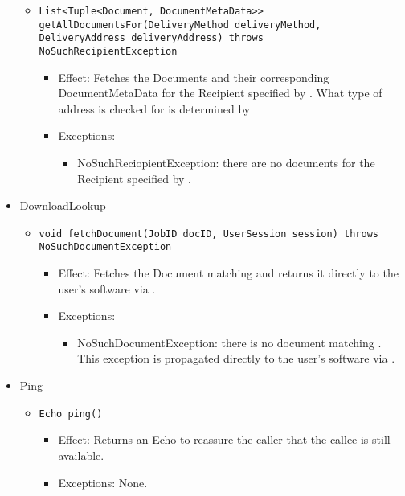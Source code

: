 \begin{itemize}
\begin{itemize}
		\item \texttt{List<Tuple<Document, DocumentMetaData>> getAllDocumentsFor(DeliveryMethod deliveryMethod, DeliveryAddress deliveryAddress) throws NoSuchRecipientException}
		\begin{itemize}
			\item Effect: Fetches the Documents and their corresponding DocumentMetaData for the Recipient specified by . What type of address is checked for is determined by 
			\item Exceptions: 
			\begin{itemize}
				\item NoSuchReciopientException: there are no documents for the Recipient specified by .
			\end{itemize}
		\end{itemize}
	\end{itemize}

    \item DownloadLookup
	\begin{itemize}
		\item \texttt{void fetchDocument(JobID docID, UserSession session) throws NoSuchDocumentException}
		\begin{itemize}
			\item Effect: Fetches the Document matching  and returns it directly to the user's software via .
			\item Exceptions:
			\begin{itemize}
				\item NoSuchDocumentException: there is no document matching . This exception is propagated directly to the user's software via .
			\end{itemize}
		\end{itemize}
	\end{itemize}

    \item Ping
	\begin{itemize}
		\item \texttt{Echo ping()}
		\begin{itemize}
			\item Effect: Returns an Echo to reassure the caller that the callee is still available.
			\item Exceptions: None.
		\end{itemize}
	\end{itemize}
\end{itemize}

